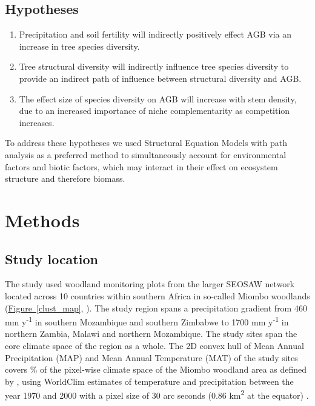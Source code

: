 \documentclass[11pt,a4paper]{article}
\begin{document}
\subsection{Hypotheses}

\begin{enumerate}
	\item{Precipitation and soil fertility will indirectly positively effect AGB via an increase in tree species diversity.}
	\item{Tree structural diversity will indirectly influence tree species diversity to provide an indirect path of influence between structural diversity and AGB.}
	\item{The effect size of species diversity on AGB will increase with stem density, due to an increased importance of niche complementarity as competition increases.}
\end{enumerate}

To address these hypotheses we used Structural Equation Models with path analysis as a preferred method to simultaneously account for environmental factors and biotic factors, which may interact in their effect on ecosystem structure and therefore biomass.

\section{Methods}

\subsection{Study location}

The study used \nplots{} woodland monitoring plots from the larger SEOSAW network \citep{seosaw_web} located across 10 countries within southern Africa in so-called Miombo woodlands (\hyperref[clust_map]{Figure~\ref*{clust_map}}, \citealt{White1987}). The study region spans a precipitation gradient from \textapprox{}460 mm y\textsuperscript{-1} in southern Mozambique and southern Zimbabwe to \textapprox{}1700 mm y\textsuperscript{-1} in northern Zambia, Malawi and northern Mozambique. The study sites span the core climate space of the region as a whole. The 2D convex hull of Mean Annual Precipitation (MAP) and Mean Annual Temperature (MAT) of the study sites covers \hullcover{}\% of the pixel-wise climate space of the Miombo woodland area as defined by \citet{White1987}, using WorldClim estimates of temperature and precipitation between the year 1970 and 2000 with a pixel size of 30 arc seconds (0.86 km\textsuperscript{2} at the equator) \citep{Fick2017}. 
\end{document}

